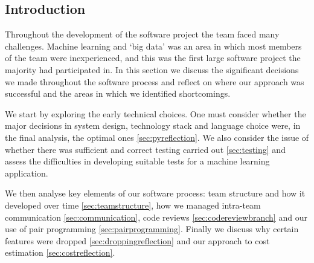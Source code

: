 \documentclass{l3proj}
\begin{document}


\subsection{Introduction}
\label{sec:leadreflection}





Throughout the development of the software project the team faced many challenges. Machine learning and ‘big data’ was an area in which most members of the team were inexperienced, and this was the first large software project the majority had participated in. In this section we discuss the significant decisions we made throughout the software process and reflect on where our approach was successful and the areas in which we identified shortcomings. 

We start by exploring the early technical choices. One must consider whether the major decisions in system design, technology stack and language choice were, in the final analysis, the optimal ones \ref{sec:pyreflection}. We also consider the issue of whether there was sufficient and correct testing carried out \ref{sec:testing} and assess the difficulties in developing suitable tests for a machine learning application.

We then analyse key elements of our software process: team structure and how it developed over time \ref{sec:teamstructure}, how we managed intra-team communication  \ref{sec:communication}, code reviews \ref{sec:codereviewbranch} and our use of pair programming \ref{sec:pairprogramming}. Finally we discuss why certain features were dropped \ref{sec:droppingreflection} and our approach to cost estimation \ref{sec:costreflection}.
\end{document}
